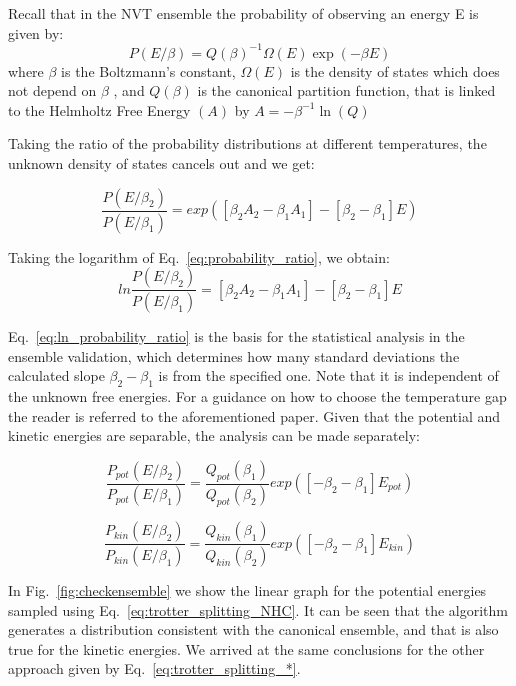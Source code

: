 \documentclass[aip,jcp,reprint,amsmath,amssymb]{revtex4-1}
\begin{document}
Recall that in the NVT ensemble the probability of observing an energy E is given by:
\[
P(E/\beta) = Q(\beta)^{-1}\Omega(E)\exp\left(-\beta E\right)
\]
where $ \beta $ is the Boltzmann's constant, $ \Omega(E) $ is the density of states which does not depend on $ \beta $ , and $ Q(\beta) $  is the canonical partition function, that is linked to the Helmholtz Free Energy $ (A) $ by $A = -\beta^{-1}\ln(Q)$

Taking the ratio of the probability distributions at different temperatures, the unknown density of states cancels out and we get:

\begin{equation}
\label{eq:probability_ratio}
\frac{P(E/\beta_2)}{P(E/\beta_1)} = exp\left([\beta_2 A_2 - \beta_1 A_1] - [\beta_2 - \beta_1]E\right)
\end{equation}

Taking the logarithm of Eq.~\ref{eq:probability_ratio}, we obtain:
\begin{equation}
\label{eq:ln_probability_ratio}
ln\frac{P(E/\beta_2)}{P(E/\beta_1)} = [\beta_2 A_2 - \beta_1 A_1] - [\beta_2 - \beta_1]E
\end{equation}

Eq.~\ref{eq:ln_probability_ratio} is the basis for the statistical analysis in the ensemble validation, which determines how many standard deviations the calculated slope $ \beta_2 - \beta_1 $ is from the specified one. Note that it is independent of the unknown free energies. For a guidance on how to choose the temperature gap the reader is referred to the aforementioned paper. Given that the potential and kinetic energies are separable, the analysis can be made separately:

\begin{equation}
\label{eq:probability_ratio_pot}
\frac{P_{pot}(E/\beta_2)}{P_{pot}(E/\beta_1)} = \frac{Q_{pot}(\beta_1)}{Q_{pot}(\beta_2)}  exp\left([-\beta_2 - \beta_1]E_{pot}\right)
\end{equation}

\begin{equation}
\label{eq:probability_ratio_kin}
\frac{P_{kin}(E/\beta_2)}{P_{kin}(E/\beta_1)} = \frac{Q_{kin}(\beta_1)}{Q_{kin}(\beta_2)}  exp\left([-\beta_2 - \beta_1]E_{kin}\right)
\end{equation}

In Fig.~\ref{fig:checkensemble} we show the linear graph for the potential energies sampled using Eq.~\ref{eq:trotter_splitting_NHC}. It can be seen that the algorithm generates a distribution consistent with the canonical ensemble, and that is also true for the kinetic energies. We arrived at the same conclusions for the other approach given by Eq.~\ref{eq:trotter_splitting_*}.
\end{document}
